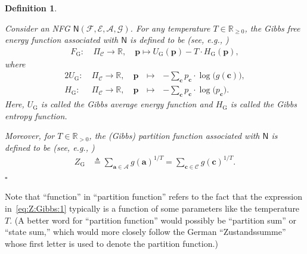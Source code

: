 \documentclass[journal, twocolumn]{IEEEtran}
\renewcommand{\mathbf}[1]{{\bm{#1}}}
\newcommand{\eg}{\emph{e.g.}}
\renewcommand{\geq}{\geqslant}
\newcommand{\R}{\mathbb{R}}
\newcommand{\Rp}{\mathbb{R}_{\geq 0}}
\newcommand{\Rpp}{\mathbb{R}_{>0}}
\newcommand{\vect}[1]{\mathbf{#1}}
\newcommand{\code}[1]{\mathcal{#1}}
\newcommand{\set}[1]{\mathcal{#1}}
\newcommand{\graph}[1]{\mathsf{#1}}
\newcommand{\defeq}{\triangleq}
\newcommand{\codeCedge}{\code{C}}
\newcommand{\setA}{\set{A}}
\newcommand{\setE}{\set{E}}
\newcommand{\setF}{\set{F}}
\newcommand{\setG}{\set{G}}
\newcommand{\va}{\vect{a}}
\newcommand{\vc}{\vect{c}}
\newcommand{\vp}{\vect{p}}
\newcommand{\graphN}{\graph{N}}
\newcommand{\?}{\mathrm{?}}
\newcommand{\qedwhite}{\hspace*{\fill}%
  $\square$\smallskip}
\newcommand{\defend}{\qedwhite}
\newcommand{\FGibbs}{F_{\mathrm{G}}}
\newcommand{\UGibbs}{U_{\mathrm{G}}}
\newcommand{\HGibbs}{H_{\mathrm{G}}}
\newcommand{\ZGibbs}{Z_{\mathrm{G}}}
\newcommand{\setPi}{\Pi}
\newtheorem{Definition}[Lemma]{Definition}
\begin{document}
\begin{Definition}
  \label{def:F:Gibbs:1}

  Consider an NFG $\graphN(\setF,\setE, \setA, \setG)$. For any temperature $T
  \in \Rp$, the Gibbs free energy function associated with $\graphN$ is
  defined to be (see, \eg, \cite{Yedidia:Freeman:Weiss:05:1}) 
  \begin{align*}
    \FGibbs: \ 
      &\setPi_{\codeCedge}
         \to 
         \R, \quad
       \vp
         \mapsto 
           \UGibbs(\vp)
           -
           T
           \cdot
           \HGibbs(\vp),
  \end{align*}
  where
  \begin{alignat*}{2}
    \UGibbs: \ 
       &
       \setPi_{\codeCedge}
         \to 
         \R, \quad
       \vp
         &
         \, \mapsto\, 
         & 
         -
         \sum_{\vc}
           p_{\vc}
           \cdot
           \log
             \big(
               g(\vc)
             \big), \\
    \HGibbs: \ 
       &
       \setPi_{\codeCedge}
         \to 
         \R, \quad
       \vp
         &
         \, \mapsto\,  
         &
         -
         \sum_{\vc}
           p_{\vc}
           \cdot
           \log
             \big(
               p_{\vc}
             \big).
  \end{alignat*}
  Here, $\UGibbs$ is called the Gibbs average energy function and $\HGibbs$ is
  called the Gibbs entropy function.
  
  Moreover, for $T \in \Rpp$, the (Gibbs) partition function associated with
  $\graphN$ is defined to be (see, \eg, \cite{Yedidia:Freeman:Weiss:05:1}) 
  \begin{align}
    \ZGibbs
      &\defeq
         \sum_{\va \in \setA}
           g(\va)^{1/T}
       = \sum_{\vc \in \codeCedge}
           g(\vc)^{1/T}.
             \label{eq:Z:Gibbs:1}
  \end{align}
  \vskip-0.40cm
  \defend
\end{Definition}


Note that ``function'' in ``partition function'' refers to the fact that the
expression in~\eqref{eq:Z:Gibbs:1} typically is a function of some parameters
like the temperature $T$. (A better word for ``partition function'' would
possibly be ``partition sum'' or ``state sum,'' which would more closely
follow the German ``Zustandssumme'' whose first letter is used to denote the
partition function.)
\end{document}
